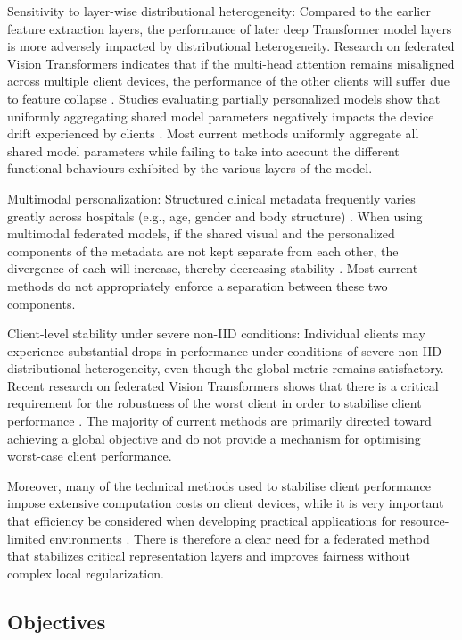 \documentclass[utf8]{FrontiersinHarvard} %
\begin{document}
Sensitivity to layer-wise distributional heterogeneity: Compared to the earlier feature extraction layers, the performance of later deep Transformer model layers is more adversely impacted by distributional heterogeneity. Research on federated Vision Transformers indicates that if the multi-head attention remains misaligned across multiple client devices, the performance of the other clients will suffer due to feature collapse \citep{Darzi2024}. Studies evaluating partially personalized models show that uniformly aggregating shared model parameters negatively impacts the device drift experienced by clients \citep{Zhu2025}. Most current methods uniformly aggregate all shared model parameters while failing to take into account the different functional behaviours exhibited by the various layers of the model.

Multimodal personalization: Structured clinical metadata frequently varies greatly across hospitals (e.g., age, gender and body structure) \citep{Nunnari2020}. When using multimodal federated models, if the shared visual and the personalized components of the metadata are not kept separate from each other, the divergence of each will increase, thereby decreasing stability \citep{Zhu2025}. Most current methods do not appropriately enforce a separation between these two components.

Client-level stability under severe non-IID conditions: Individual clients may experience substantial drops in performance under conditions of severe non-IID distributional heterogeneity, even though the global metric remains satisfactory. Recent research on federated Vision Transformers shows that there is a critical requirement for the robustness of the worst client in order to stabilise client performance \citep{Darzi2024,Zhao2025}. The majority of current methods are primarily directed toward achieving a global objective and do not provide a mechanism for optimising worst-case client performance.

Moreover, many of the technical methods used to stabilise client performance impose extensive computation costs on client devices, while it is very important that efficiency be considered when developing practical applications for resource-limited environments \citep{Wu2024}. There is therefore a clear need for a federated method that stabilizes critical representation layers and improves fairness without complex local regularization.

\subsection{Objectives}
\end{document}
